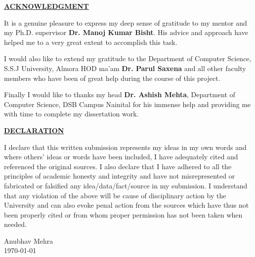 \documentclass[a4paper, 12pt]{article}
\begin{document}
\begin{sloppypar}
\begin{center}
\textbf{\underline{ACKNOWLEDGMENT}}
\end{center}
It is a genuine pleasure to express my deep sense of gratitude to my mentor and my Ph.D. supervisor \textbf{Dr. Manoj Kumar Bisht}. His advice and approach have helped me to a very great extent to accomplish this task. 

I would also like to extend my gratitude to the Department of Computer Science, S.S.J University, Almora HOD ma'am \textbf{Dr. Parul Saxena} and all other faculty members who have been of great help during the course of this project.

Finally I would like to thanks my head \textbf{Dr. Ashish Mehta}, Department of Computer Science, DSB Campus Nainital for his immense help and providing me with time to complete my dissertation work.
\thispagestyle{empty}
\clearpage
\begin{center}
\textbf{\underline{DECLARATION}}
\end{center}
I declare that this written submission represents my ideas in my own words and where others' ideas or words have been included, I have adequately cited and referenced the original sources. I also declare that I have adhered to all the principles of academic honesty and integrity and have not  misrepresented or fabricated or falsified any idea/data/fact/source in my submission. I understand that any violation of the above will be cause of disciplinary action by the University and can also evoke penal action from the sources which have thus not been properly cited or from whom proper permission has not been taken when needed.
\begin{flushright}
Anubhav Mehra \\
\today
\end{flushright}
\thispagestyle{empty}
\clearpage


\end{sloppypar}
\end{document}
